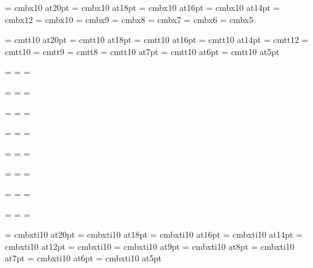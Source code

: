 \font\twentybf=     cmbx10 at20pt
\font\eighteenbf=   cmbx10 at18pt
\font\sixteenbf=    cmbx10 at16pt
\font\fourteenbf=   cmbx10 at14pt
\font\twelvebf=     cmbx12
\font\tenbf=        cmbx10
\font\ninebf=       cmbx9
\font\eightbf=      cmbx8
\font\sevenbf=      cmbx7
\font\sixbf=        cmbx6
\font\fivebf=       cmbx5

\font\twentytt=     cmtt10 at20pt
\font\eighteentt=   cmtt10 at18pt
\font\sixteentt=    cmtt10 at16pt
\font\fourteentt=   cmtt10 at14pt
\font\twelvett=     cmtt12
\font\tentt=        cmtt10
\font\ninett=       cmtt9
\font\eighttt=      cmtt8
\font\seventt=      cmtt10 at7pt
\font\sixtt=        cmtt10 at6pt
\font\fivett=       cmtt10 at5pt




=\tenrm
{}=\sevenrm
{}=\fiverm
\def\rm{\fam=0 \tenrm}

=\teni
{}=\seveni
{}=\fivei
\def\mit{\fam=1}

=\tensy
{}=\sevensy
{}=\fivesy
\def\cal{\fam=2}

=\tenex
{}=\sevenex
{}=\fiveex


\def\it{\fam=\itfam \tenit}
\textfont\itfam=\tenit
\scriptfont\itfam=\sevenit
\scriptscriptfont\itfam=\fiveit

\def\sl{\fam=\slfam \tensl}
\textfont\slfam=\tensl
\scriptfont\slfam=\sevensl
\scriptscriptfont\slfam=\fivesl

\def\bf{\fam=\bffam \tenbf}
\textfont\bffam=\tenbf
\scriptfont\bffam=\sevenbf
\scriptscriptfont\bffam=\fivebf

\def\tt{\fam=\ttfam \tentt}
\textfont\ttfam=\tentt
\scriptfont\ttfam=\seventt
\scriptscriptfont\ttfam=\fivett

\font\twentyitbf=      cmbxti10 at20pt
\font\eighteenitbf=    cmbxti10 at18pt
\font\sixteenitbf=     cmbxti10 at16pt
\font\fourteenitbf=    cmbxti10 at14pt
\font\twelveitbf=      cmbxti10 at12pt
\font\itbf=            cmbxti10
\font\nineitbf=        cmbxti10 at9pt
\font\eightitbf=       cmbxti10 at8pt
\font\sevenitbf=       cmbxti10 at7pt
\font\sixitbf=         cmbxti10 at6pt
\font\fiveitbf=        cmbxti10 at5pt

